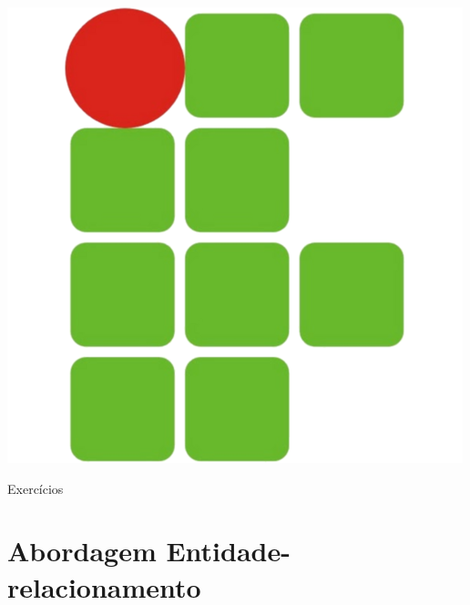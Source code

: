 \documentclass[11pt]{article}
\begin{document}
	
\pagestyle{fancy}
\renewcommand{\headrulewidth}{0pt}
\renewcommand{\footrulewidth}{2.1pt}
	
\begin{minipage}[c][1.5cm][c]{3cm}
	\begin{flushleft}
		\includegraphics[scale=0.25]{IFRN}
	\end{flushleft}
\end{minipage}		
\begin{minipage}[c][1.5cm][c]{10.8cm}
	\begin{center}
		\par
		\par
		\resizebox{!}{0.2cm}{\today}
	\end{center}
\end{minipage}

\begin{center}
Exercícios
\end{center}

\section{Abordagem Entidade-relacionamento}
\end{document}

